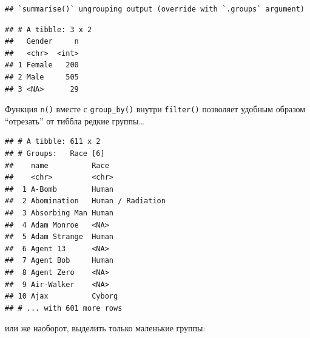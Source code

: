 \documentclass[]{book}
\newenvironment{Shaded}{\begin{snugshade}}{\end{snugshade}}
\newcommand{\KeywordTok}[1]{\textcolor[rgb]{0.13,0.29,0.53}{\textbf{#1}}}
\newcommand{\DataTypeTok}[1]{\textcolor[rgb]{0.13,0.29,0.53}{#1}}
\newcommand{\DecValTok}[1]{\textcolor[rgb]{0.00,0.00,0.81}{#1}}
\newcommand{\StringTok}[1]{\textcolor[rgb]{0.31,0.60,0.02}{#1}}
\newcommand{\OperatorTok}[1]{\textcolor[rgb]{0.81,0.36,0.00}{\textbf{#1}}}
\newcommand{\NormalTok}[1]{#1}
\begin{document}
\begin{Shaded}
\end{Shaded}

\begin{verbatim}
## `summarise()` ungrouping output (override with `.groups` argument)
\end{verbatim}

\begin{verbatim}
## # A tibble: 3 x 2
##   Gender     n
##   <chr>  <int>
## 1 Female   200
## 2 Male     505
## 3 <NA>      29
\end{verbatim}

Функция \texttt{n()} вместе с \texttt{group\_by()} внутри
\texttt{filter()} позволяет удобным образом ``отрезать'' от тиббла
редкие группы\ldots{}

\begin{Shaded}
\end{Shaded}

\begin{verbatim}
## # A tibble: 611 x 2
## # Groups:   Race [6]
##    name          Race             
##    <chr>         <chr>            
##  1 A-Bomb        Human            
##  2 Abomination   Human / Radiation
##  3 Absorbing Man Human            
##  4 Adam Monroe   <NA>             
##  5 Adam Strange  Human            
##  6 Agent 13      <NA>             
##  7 Agent Bob     Human            
##  8 Agent Zero    <NA>             
##  9 Air-Walker    <NA>             
## 10 Ajax          Cyborg           
## # ... with 601 more rows
\end{verbatim}

или же наоборот, выделить только маленькие группы:

\begin{Shaded}
\end{Shaded}
\end{document}
